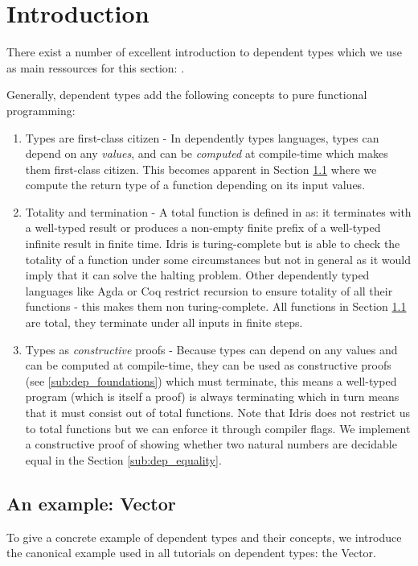 \section{Introduction}
\label{sec:dep_background}

There exist a number of excellent introduction to dependent types which we use as main ressources for this section: \cite{thompson_type_1991, program_homotopy_2013, stump_verified_2016, brady_type-driven_2017, pierce_programming_2018}.

Generally, dependent types add the following concepts to pure functional programming:

\begin{enumerate}
	\item Types are first-class citizen - In dependently types languages, types can depend on any \textit{values}, and can be \textit{computed} at compile-time which makes them first-class citizen. This becomes apparent in Section \ref{sub:dep_vector} where we compute the return type of a function depending on its input values.

	\item Totality and termination - A total function is defined in \cite{brady_type-driven_2017} as: it terminates with a well-typed result or produces a non-empty finite prefix of a well-typed infinite result in finite time. Idris is turing-complete but is able to check the totality of a function under some circumstances but not in general as it would imply that it can solve the halting problem. Other dependently typed languages like Agda or Coq restrict recursion to ensure totality of all their functions - this makes them non turing-complete. All functions in Section \ref{sub:dep_vector} are total, they terminate under all inputs in finite steps.

	\item Types as \textit{constructive} proofs - Because types can depend on any values and can be computed at compile-time, they can be used as constructive proofs (see \ref{sub:dep_foundations}) which must terminate, this means a well-typed program (which is itself a proof) is always terminating which in turn means that it must consist out of total functions. Note that Idris does not restrict us to total functions but we can enforce it through compiler flags. We implement a constructive proof of showing whether two natural numbers are decidable equal in the Section \ref{sub:dep_equality}.
\end{enumerate}

\subsection{An example: Vector}
\label{sub:dep_vector}
To give a concrete example of dependent types and their concepts, we introduce the canonical example used in all tutorials on dependent types: the Vector.


